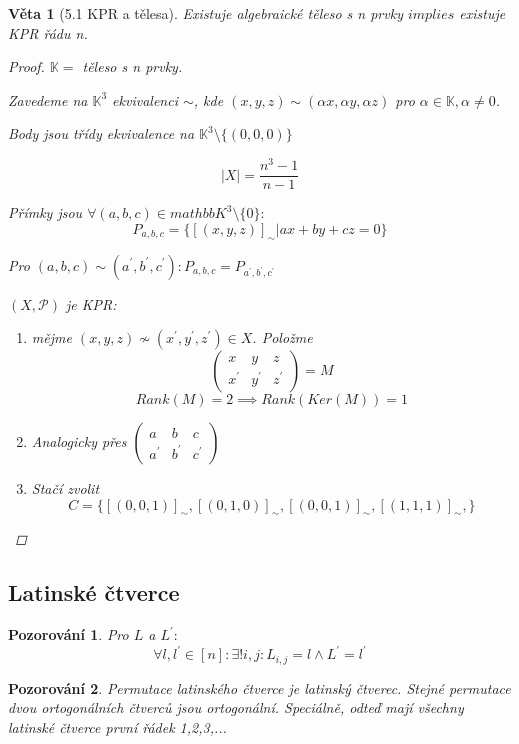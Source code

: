 \documentclass[10pt,a4paper]{article}
\theoremstyle{plain}
\newtheorem*{veta}{Věta}
\newtheorem*{pozorovani}{Pozorování}
\begin{document}
\begin{veta}[5.1 KPR a tělesa] 
Existuje algebraické těleso s n prvky $implies$ existuje KPR řádu n.
\begin{proof}
$\mathbb{K} = $ těleso s n prvky.

Zavedeme na $\mathbb{K}^3$ ekvivalenci $\sim$, kde $(x,y,z) \sim (\alpha x, \alpha y, \alpha z)$ pro $\alpha \in \mathbb{K}, \alpha \neq 0$.

Body jsou třídy ekvivalence na $\mathbb{K}^3 \setminus \{(0,0,0)\}$

\[|X| = \frac{n^3-1}{n-1}\]

Přímky jsou $\forall (a,b,c) \in mathbb{K}^3 \setminus \{0\}:$
\[ P_{a,b,c} = \{ [(x,y,z)]_\sim | ax+by+cz = 0 \}\]

Pro  $(a,b,c) \sim (a^\prime,b^\prime,c^\prime): P_{a,b,c} = P_{a^\prime,b^\prime,c^\prime}$

$(X, \mathcal{P})$ je KPR:

\begin{enumerate}[label=A\arabic*]
\item mějme $(x,y,z)\nsim (x^\prime,y^\prime,z^\prime) \in X$. Položme 
\[\begin{pmatrix}
x&y&z \\ x^\prime&y^\prime&z^\prime
\end{pmatrix} = M \]
\[ Rank(M) = 2 \implies Rank(Ker(M)) = 1 \]
\item Analogicky přes $\begin{pmatrix}
a&b&c \\ a^\prime&b^\prime&c^\prime
\end{pmatrix}$
\item Stačí zvolit \[ C = \{ [(0,0,1)]_\sim, [(0,1,0)]_\sim, [(0,0,1)]_\sim, [(1,1,1)]_\sim,\}\]
\end{enumerate}
\end{proof}
\end{veta}

\subsection{Latinské čtverce}

\begin{pozorovani}
Pro $L$ a $L^\prime:$
\[ \forall l,l^\prime \in [n]: \exists! i,j: L_{i,j} = l \wedge L^\prime = l^\prime \]
\end{pozorovani}

\begin{pozorovani}
Permutace latinského čtverce je latinský čtverec. Stejné permutace dvou ortogonálních čtverců jsou ortogonální. Speciálně, odteď mají všechny latinské čtverce první řádek 1,2,3,...
\end{pozorovani}
\end{document}
